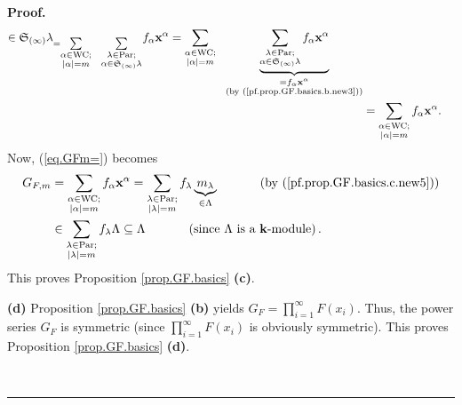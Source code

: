 \documentclass[numbers=enddot,12pt,final,onecolumn,notitlepage]{scrartcl}%
\theoremstyle{definition}
\newenvironment{proof}[1][Proof]{\noindent\textbf{#1.} }{\ \rule{0.5em}{0.5em}}
\let\sumnonlimits\sum
\let\prodnonlimits\prod
\renewcommand{\sum}{\sumnonlimits\limits}
\renewcommand{\prod}{\prodnonlimits\limits}
\newenvironment{verlong}{}{}
\begin{document}
\begin{verlong}
\begin{proof}
\begin{align}
{{\in\mathfrak{S}_{\left(  \infty\right)  }\lambda}}_{=\sum_{\substack{\alpha
\in\operatorname*{WC};\\\left\vert \alpha\right\vert =m}}\ \ \sum
_{\substack{\lambda\in\operatorname*{Par};\\\alpha\in\mathfrak{S}_{\left(
\infty\right)  }\lambda}}}f_{\alpha}\mathbf{x}^{\alpha}=\sum_{\substack{\alpha
\in\operatorname*{WC};\\\left\vert \alpha\right\vert =m}}\ \ \underbrace{\sum
_{\substack{\lambda\in\operatorname*{Par};\\\alpha\in\mathfrak{S}_{\left(
\infty\right)  }\lambda}}f_{\alpha}\mathbf{x}^{\alpha}}_{\substack{=f_{\alpha
}\mathbf{x}^{\alpha}\\\text{(by (\ref{pf.prop.GF.basics.b.new3}))}%
}}\nonumber\\
&  =\sum_{\substack{\alpha\in\operatorname*{WC};\\\left\vert \alpha\right\vert
=m}}f_{\alpha}\mathbf{x}^{\alpha}. \label{pf.prop.GF.basics.c.new5}%
\end{align}
Now, (\ref{eq.GFm=}) becomes%
\begin{align*}
G_{F,m}  &  =\sum_{\substack{\alpha\in\operatorname*{WC};\\\left\vert
\alpha\right\vert =m}}f_{\alpha}\mathbf{x}^{\alpha}=\sum_{\substack{\lambda
\in\operatorname*{Par};\\\left\vert \lambda\right\vert =m}}f_{\lambda
}\underbrace{m_{\lambda}}_{\in\Lambda}\ \ \ \ \ \ \ \ \ \ \left(  \text{by
(\ref{pf.prop.GF.basics.c.new5})}\right) \\
&  \in\sum_{\substack{\lambda\in\operatorname*{Par};\\\left\vert
\lambda\right\vert =m}}f_{\lambda}\Lambda\subseteq\Lambda
\ \ \ \ \ \ \ \ \ \ \left(  \text{since }\Lambda\text{ is a }\mathbf{k}%
\text{-module}\right)  .
\end{align*}
This proves Proposition \ref{prop.GF.basics} \textbf{(c)}.

\textbf{(d)} Proposition \ref{prop.GF.basics} \textbf{(b)} yields $G_{F}%
=\prod_{i=1}^{\infty}F\left(  x_{i}\right)  $. Thus, the power series $G_{F}$
is symmetric (since $\prod_{i=1}^{\infty}F\left(  x_{i}\right)  $ is obviously
symmetric). This proves Proposition \ref{prop.GF.basics} \textbf{(d)}.


\end{proof}
\end{verlong}
\end{document}
